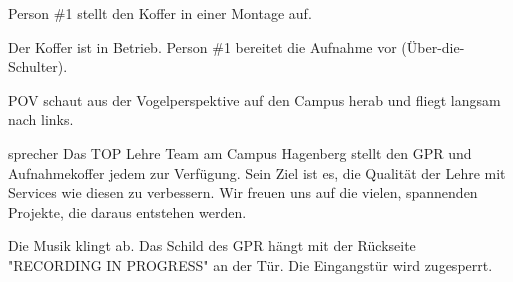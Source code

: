 \documentclass{screenplay}
\begin{document}
	Person \#1 stellt den Koffer in einer Montage auf.
	
	Der Koffer ist in Betrieb. Person \#1 bereitet die Aufnahme vor (Über-die-Schulter).
	
	
	POV schaut aus der Vogelperspektive auf den Campus herab und fliegt langsam nach links.
	
	\begin{dialogue}{sprecher}
		Das TOP Lehre Team am Campus Hagenberg stellt den GPR und Aufnahmekoffer jedem zur Verfügung. Sein Ziel ist es, die Qualität der Lehre mit Services wie diesen zu verbessern. Wir freuen uns auf die vielen, spannenden Projekte, die daraus entstehen werden.
	\end{dialogue}
	
	
	Die Musik klingt ab. Das Schild des GPR hängt mit der Rückseite "RECORDING IN PROGRESS" an der Tür. Die Eingangstür wird zugesperrt.
	
	\fadeout
	\theend
\end{document}
